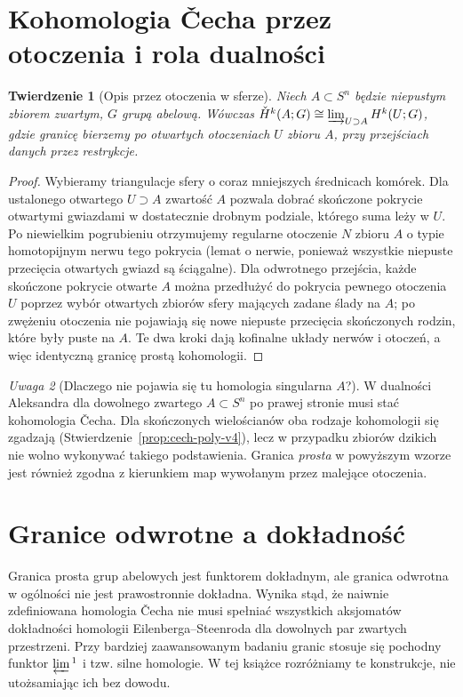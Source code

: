 \documentclass[11pt,a4paper,oneside]{report}
\theoremstyle{plain}
\newtheorem{twierdzenie}{Twierdzenie}[section]
\theoremstyle{definition}
\theoremstyle{remark}
\newtheorem{uwaga}[twierdzenie]{Uwaga}
\begin{document}
\section{Kohomologia \v{C}echa przez otoczenia i rola dualności}
\begin{twierdzenie}[Opis przez otoczenia w sferze]
\label{thm:cech-neighbourhood-v4}
Niech $A\subset S^n$ będzie niepustym zbiorem zwartym,
$G$ grupą abelową. Wówczas
$\check H^k(A;G)\cong\varinjlim_{U\supset A}H^k(U;G)$,
gdzie granicę bierzemy po otwartych otoczeniach $U$ zbioru
$A$, przy przejściach danych przez restrykcje.
\end{twierdzenie}
\begin{proof}
Wybieramy triangulacje sfery o coraz mniejszych średnicach
komórek. Dla ustalonego otwartego $U\supset A$ zwartość $A$
pozwala dobrać skończone pokrycie otwartymi gwiazdami
w dostatecznie drobnym podziale, którego suma leży w $U$.
Po niewielkim pogrubieniu otrzymujemy regularne otoczenie
$N$ zbioru $A$ o typie homotopijnym nerwu tego pokrycia
(lemat o nerwie, ponieważ wszystkie niepuste przecięcia
otwartych gwiazd są ściągalne). Dla odwrotnego przejścia,
każde skończone pokrycie otwarte $A$ można przedłużyć do
pokrycia pewnego otoczenia $U$ poprzez wybór otwartych
zbiorów sfery mających zadane ślady na $A$; po zwężeniu
otoczenia nie pojawiają się nowe niepuste przecięcia
skończonych rodzin, które były puste na $A$.
Te dwa kroki dają kofinalne układy nerwów i otoczeń,
a więc identyczną granicę prostą kohomologii.
\end{proof}

\begin{uwaga}[Dlaczego nie pojawia się tu homologia singularna $A$?]
W dualności Aleksandra dla dowolnego zwartego $A\subset S^n$
po prawej stronie musi stać kohomologia \v{C}echa.
Dla skończonych wielościanów oba rodzaje kohomologii
się zgadzają (Stwierdzenie~\ref{prop:cech-poly-v4}),
lecz w przypadku zbiorów dzikich nie wolno wykonywać
takiego podstawienia. Granica \emph{prosta} w powyższym
wzorze jest również zgodna z kierunkiem map wywołanym
przez malejące otoczenia.
\end{uwaga}

\section{Granice odwrotne a dokładność}
Granica prosta grup abelowych jest funktorem dokładnym,
ale granica odwrotna w ogólności nie jest prawostronnie
dokładna. Wynika stąd, że naiwnie zdefiniowana homologia
\v{C}echa nie musi spełniać wszystkich aksjomatów dokładności
homologii Eilenberga--Steenroda dla dowolnych par zwartych
przestrzeni. Przy bardziej zaawansowanym badaniu granic
stosuje się pochodny funktor $\varprojlim{}^1$ i tzw.
silne homologie. W tej książce rozróżniamy te konstrukcje,
nie utożsamiając ich bez dowodu.
\end{document}
